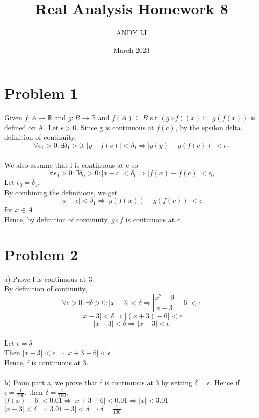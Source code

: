\documentclass{article}
\title{Real Analysis Homework 8}
\author{ANDY LI}
\date{March 2023}
\begin{document}
\maketitle
\section*{Problem 1}
Given $f: A \to \mathbb{R}$ and $g: B \to \mathbb{R}$ and $f(A) \subseteq B$ s.t $(g \circ f)(x) := g(f(x))$ is defined on A.
Let $\epsilon > 0$. Since g is continuous at $f(c)$, by the epsilon delta definition of continuity, $$\forall \epsilon_1 > 0 : \exists \delta_1 > 0 : |y - f(c)| < \delta_1 \Rightarrow |g(y) - g(f(c))| < \epsilon_1$$
\\We also assume that f is continuous at c so $$\forall \epsilon_0 > 0 : \exists \delta_0 > 0: |x - c| < \delta_0 \Rightarrow |f(x) - f(c)| < \epsilon_0$$
Let $\epsilon_0 = \delta_1$.
\\By combining the definitions, we get $$|x - c| < \delta_1 \Rightarrow |g(f(x)) - g(f(c))| < \epsilon$$ for $x \in A$
\\Hence, by definition of continuity, $g \circ f$ is continuous at c.

\section*{Problem 2}
a) Prove f is continuous at 3.
\\By definition of continuity, $$\forall \epsilon > 0 : \exists \delta > 0: |x - 3| < \delta \Rightarrow |\frac{x^2 - 9}{x-3} - 6| < \epsilon$$
$$|x - 3| < \delta \Rightarrow |(x + 3) - 6| < \epsilon$$
$$|x - 3| < \delta \Rightarrow |x - 3| < \epsilon$$
\\Let $\epsilon = \delta$
\\Then $|x - 3| < \epsilon \Rightarrow |x + 3 - 6| < \epsilon$ 
\\Hence, f is continuous at 3.
\\
\\b) From part a, we prove that f is continuous at 3 by setting $\delta = \epsilon$. Hence if $\epsilon = \frac{1}{100}$, then $\delta = \frac{1}{100}$.
\\$|f(x) - 6| < 0.01 \Rightarrow |x + 3 - 6| < 0.01 \Rightarrow |x| < 3.01$ 
\\$|x - 3| < \delta \Rightarrow |3.01 - 3| < \delta \Rightarrow \delta = \frac{1}{100}$
\end{document}
